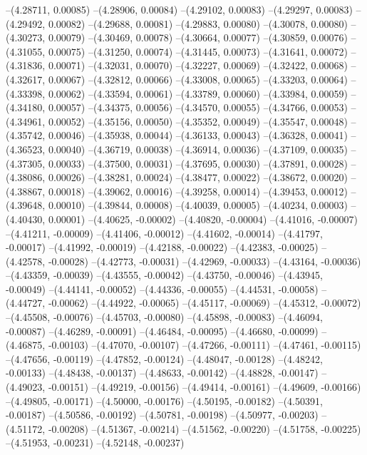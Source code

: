 --(4.28711, 0.00085)
--(4.28906, 0.00084)
--(4.29102, 0.00083)
--(4.29297, 0.00083)
--(4.29492, 0.00082)
--(4.29688, 0.00081)
--(4.29883, 0.00080)
--(4.30078, 0.00080)
--(4.30273, 0.00079)
--(4.30469, 0.00078)
--(4.30664, 0.00077)
--(4.30859, 0.00076)
--(4.31055, 0.00075)
--(4.31250, 0.00074)
--(4.31445, 0.00073)
--(4.31641, 0.00072)
--(4.31836, 0.00071)
--(4.32031, 0.00070)
--(4.32227, 0.00069)
--(4.32422, 0.00068)
--(4.32617, 0.00067)
--(4.32812, 0.00066)
--(4.33008, 0.00065)
--(4.33203, 0.00064)
--(4.33398, 0.00062)
--(4.33594, 0.00061)
--(4.33789, 0.00060)
--(4.33984, 0.00059)
--(4.34180, 0.00057)
--(4.34375, 0.00056)
--(4.34570, 0.00055)
--(4.34766, 0.00053)
--(4.34961, 0.00052)
--(4.35156, 0.00050)
--(4.35352, 0.00049)
--(4.35547, 0.00048)
--(4.35742, 0.00046)
--(4.35938, 0.00044)
--(4.36133, 0.00043)
--(4.36328, 0.00041)
--(4.36523, 0.00040)
--(4.36719, 0.00038)
--(4.36914, 0.00036)
--(4.37109, 0.00035)
--(4.37305, 0.00033)
--(4.37500, 0.00031)
--(4.37695, 0.00030)
--(4.37891, 0.00028)
--(4.38086, 0.00026)
--(4.38281, 0.00024)
--(4.38477, 0.00022)
--(4.38672, 0.00020)
--(4.38867, 0.00018)
--(4.39062, 0.00016)
--(4.39258, 0.00014)
--(4.39453, 0.00012)
--(4.39648, 0.00010)
--(4.39844, 0.00008)
--(4.40039, 0.00005)
--(4.40234, 0.00003)
--(4.40430, 0.00001)
--(4.40625, -0.00002)
--(4.40820, -0.00004)
--(4.41016, -0.00007)
--(4.41211, -0.00009)
--(4.41406, -0.00012)
--(4.41602, -0.00014)
--(4.41797, -0.00017)
--(4.41992, -0.00019)
--(4.42188, -0.00022)
--(4.42383, -0.00025)
--(4.42578, -0.00028)
--(4.42773, -0.00031)
--(4.42969, -0.00033)
--(4.43164, -0.00036)
--(4.43359, -0.00039)
--(4.43555, -0.00042)
--(4.43750, -0.00046)
--(4.43945, -0.00049)
--(4.44141, -0.00052)
--(4.44336, -0.00055)
--(4.44531, -0.00058)
--(4.44727, -0.00062)
--(4.44922, -0.00065)
--(4.45117, -0.00069)
--(4.45312, -0.00072)
--(4.45508, -0.00076)
--(4.45703, -0.00080)
--(4.45898, -0.00083)
--(4.46094, -0.00087)
--(4.46289, -0.00091)
--(4.46484, -0.00095)
--(4.46680, -0.00099)
--(4.46875, -0.00103)
--(4.47070, -0.00107)
--(4.47266, -0.00111)
--(4.47461, -0.00115)
--(4.47656, -0.00119)
--(4.47852, -0.00124)
--(4.48047, -0.00128)
--(4.48242, -0.00133)
--(4.48438, -0.00137)
--(4.48633, -0.00142)
--(4.48828, -0.00147)
--(4.49023, -0.00151)
--(4.49219, -0.00156)
--(4.49414, -0.00161)
--(4.49609, -0.00166)
--(4.49805, -0.00171)
--(4.50000, -0.00176)
--(4.50195, -0.00182)
--(4.50391, -0.00187)
--(4.50586, -0.00192)
--(4.50781, -0.00198)
--(4.50977, -0.00203)
--(4.51172, -0.00208)
--(4.51367, -0.00214)
--(4.51562, -0.00220)
--(4.51758, -0.00225)
--(4.51953, -0.00231)
--(4.52148, -0.00237)
